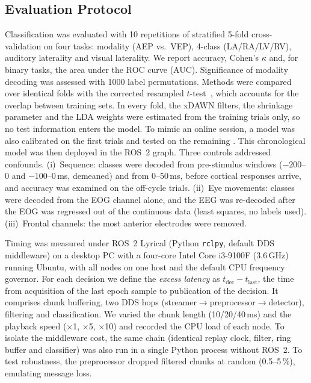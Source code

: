 \documentclass[conference]{IEEEtran}
\begin{document}
\subsection{Evaluation Protocol}
Classification was evaluated with 10 repetitions of stratified 5-fold cross-validation on four tasks: modality (AEP vs.\ VEP), 4-class (LA/RA/LV/RV), auditory laterality and visual laterality. We report accuracy, Cohen's $\kappa$ and, for binary tasks, the area under the ROC curve (AUC). Significance of modality decoding was assessed with 1000 label permutations. Methods were compared over identical folds with the corrected resampled $t$-test~\cite{nadeau2003inference}, which accounts for the overlap between training sets. In every fold, the xDAWN filters, the shrinkage parameter and the LDA weights were estimated from the training trials only, so no test information enters the model. To mimic an online session, a model was also calibrated on the first \Ncal{} trials and tested on the remaining \Ntest. This chronological model was then deployed in the ROS~2 graph. Three controls addressed confounds. (i)~Sequence: classes were decoded from pre-stimulus windows ($-200$--$0$ and $-100$--$0$\,ms, demeaned) and from 0--50\,ms, before cortical responses arrive, and accuracy was examined on the \OffCycleN{} off-cycle trials. (ii)~Eye movements: classes were decoded from the EOG channel alone, and the EEG was re-decoded after the EOG was regressed out of the continuous data (least squares, no labels used). (iii)~Frontal channels: the \FrontN{} most anterior electrodes were removed.

Timing was measured under ROS~2 Lyrical (Python \texttt{rclpy}, default DDS middleware) on a desktop PC with a four-core Intel Core i3-9100F (3.6\,GHz) running Ubuntu, with all nodes on one host and the default CPU frequency governor. For each decision we define the \emph{excess latency} as $t_{\mathrm{dec}}-t_{\mathrm{last}}$, the time from acquisition of the last epoch sample to publication of the decision. It comprises chunk buffering, two DDS hops (streamer$\rightarrow$preprocessor$\rightarrow$detector), filtering and classification. We varied the chunk length (10/20/40\,ms) and the playback speed ($\times$1, $\times$5, $\times$10) and recorded the CPU load of each node. To isolate the middleware cost, the same chain (identical replay clock, filter, ring buffer and classifier) was also run in a single Python process without ROS~2. To test robustness, the preprocessor dropped filtered chunks at random (0.5--5\,\%), emulating message loss.
\end{document}
